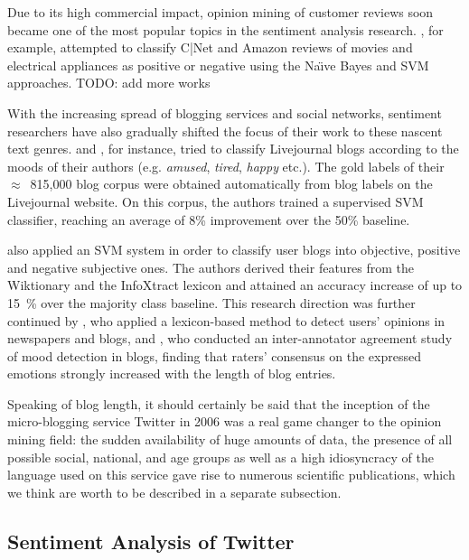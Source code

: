 Due to its high commercial impact, opinion mining of customer reviews
soon became one of the most popular topics in the sentiment analysis
research. \citet{Dave:03}, for example, attempted to classify C|Net
and Amazon reviews of movies and electrical appliances as positive or
negative using the Na\"{\i}ve Bayes and SVM approaches.
TODO: add more works

With the increasing spread of blogging services and social networks,
sentiment researchers have also gradually shifted the focus of their
work to these nascent text genres. \citet{Mishne:05} and
\citet{Mishne:07}, for instance, tried to classify Livejournal blogs
according to the moods of their authors (e.g.  \emph{amused},
\emph{tired}, \emph{happy} etc.).  The gold labels of their
$\approx$~815,000 blog corpus were obtained automatically from blog
labels on the Livejournal website.  On this corpus, the authors
trained a supervised SVM classifier, reaching an average of 8\%
improvement over the 50\% baseline.

\citet{Chesley:06} also applied an SVM system in order to classify
user blogs into objective, positive and negative subjective ones.  The
authors derived their features from the Wiktionary and the InfoXtract
lexicon \citep{Srihari:03} and attained an accuracy increase of up to
15~\% over the majority class baseline.  This research direction was
further continued by \citet{Godbole:07}, who applied a lexicon-based
method to detect users' opinions in newspapers and blogs, and
\citet{Gill:08}, who conducted an inter-annotator agreement study of
mood detection in blogs, finding that raters' consensus on the
expressed emotions strongly increased with the length of blog entries.

Speaking of blog length, it should certainly be said that the
inception of the micro-blogging service Twitter in 2006 was a real
game changer to the opinion mining field: the sudden availability of
huge amounts of data, the presence of all possible social, national,
and age groups as well as a high idiosyncracy of the language used on
this service gave rise to numerous scientific publications, which we
think are worth to be described in a separate subsection.

\subsection{Sentiment Analysis of Twitter}

